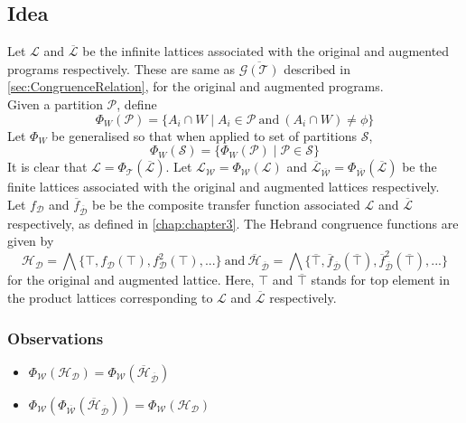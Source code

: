 \subsection{Idea}
\label{subsec:Idea}
Let $\mathcal{L}$ and $\overline{\mathcal{L}}$ be the infinite lattices associated with the original and augmented programs respectively. These are same as $\overline{\mathcal{G}(\mathcal{T})}$ described in \autoref{sec:CongruenceRelation}, for the original and augmented programs.
\\
Given a partition $\mathcal{P}$, define 
$$\Phi_W(\mathcal{P}) = \{A_i \cap W \mid A_i \in \mathcal{P} \ \mathrm{and} \ (A_i \cap W) \neq \phi\}$$
Let $\Phi_W$ be generalised so that when applied to set of partitions $\mathcal{S}$,
$$\Phi_W(\mathcal{S}) = \{\Phi_W(\mathcal{P}) \mid \mathcal{P} \in \mathcal{S}\}$$
It is clear that $\mathcal{L} = \Phi_{\mathcal{T}}(\overline{\mathcal{L}})$. Let $\mathcal{L}_{\mathcal{W}} = \Phi_{\mathcal{W}}(\mathcal{L})$ and $\overline{\mathcal{L}}_{\overline{\mathcal{W}}} = \Phi_{\overline{\mathcal{W}}}(\overline{\mathcal{L}})$ be the finite lattices associated with the original and augmented lattices respectively.
\\
Let $f_{\mathcal{D}}$ and $\overline{f}_{\overline{\mathcal{D}}}$ be be the composite transfer function associated $\mathcal{L}$ and $\overline{\mathcal{L}}$ respectively, as defined in \autoref{chap:chapter3}. The Hebrand congruence functions are given by 
$$\mathcal{H}_{\mathcal{D}} = \bigwedge \{\top, f_{\mathcal{D}}(\top), f_{\mathcal{D}}^2(\top), ...\}\ \mathrm{and}\ \overline{\mathcal{H}}_{\overline{\mathcal{D}}} = \bigwedge \{\overline{\top}, \overline{f}_{\overline{\mathcal{D}}}(\overline{\top}), \overline{f}_{\overline{\mathcal{D}}}^2(\overline{\top}), ...\}$$
for the original and augmented lattice. Here, $\top$ and $\overline{\top}$ stands for top element in the product lattices corresponding to $\mathcal{L}$ and $\overline{\mathcal{L}}$ respectively.

\subsubsection{Observations}
\label{subsubsec:Observations}
\begin{itemize}
    \item $\Phi_{\mathcal{W}}(\mathcal{H}_{\mathcal{D}}) = \Phi_{\mathcal{W}}(\overline{\mathcal{H}}_{\overline{\mathcal{D}}})$
    \item $\Phi_{\mathcal{W}}(\Phi_{\overline{\mathcal{W}}}(\overline{\mathcal{H}}_{\overline{\mathcal{D}}})) = \Phi_{\mathcal{W}}(\mathcal{H}_{\mathcal{D}})$
\end{itemize}

